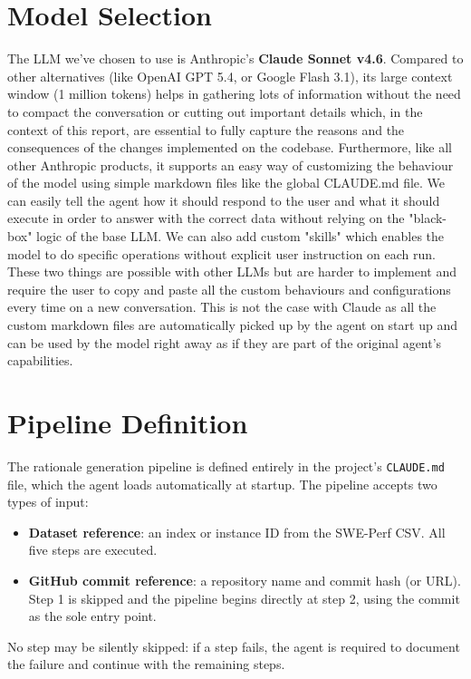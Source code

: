 \documentclass[12pt, a4paper]{article}
\begin{document}
\section{Model Selection}
\label{sec:model-selection}
The LLM we've chosen to use is Anthropic's \textbf{Claude Sonnet v4.6}. Compared to other alternatives (like OpenAI GPT 5.4, or Google Flash 3.1), its large context window (1 million tokens) helps in gathering lots of information without the need to compact the conversation or cutting out important details which, in the context of this report, are essential to fully capture the reasons and the consequences of the changes implemented on the codebase.
Furthermore, like all other Anthropic products, it supports an easy way of customizing the behaviour of the model using simple markdown files like the global CLAUDE.md file. We can easily tell the agent how it should respond to the user and what it should execute in order to answer with the correct data without relying on the "black-box" logic of the base LLM. 
We can also add custom "skills" which enables the model to do specific operations without explicit user instruction on each run.
These two things are possible with other LLMs but are harder to implement and require the user to copy and paste all the custom behaviours and configurations every time on a new conversation. 
This is not the case with Claude as all the custom markdown files are automatically picked up by the agent on start up and can be used by the model right away as if they are part of the original agent's capabilities. 
\section{Pipeline Definition}
\label{sec:pipeline-definition}

The rationale generation pipeline is defined entirely in the project's \texttt{CLAUDE.md} file, which the agent loads automatically at startup.
The pipeline accepts two types of input:

\begin{itemize}
    \item \textbf{Dataset reference}: an index or instance ID from the SWE-Perf CSV. All five steps are executed.
    \item \textbf{GitHub commit reference}: a repository name and commit hash (or URL). Step 1 is skipped and the pipeline begins directly at step 2, using the commit as the sole entry point.
\end{itemize}

No step may be silently skipped: if a step fails, the agent is required to document the failure and continue with the remaining steps.
\end{document}

